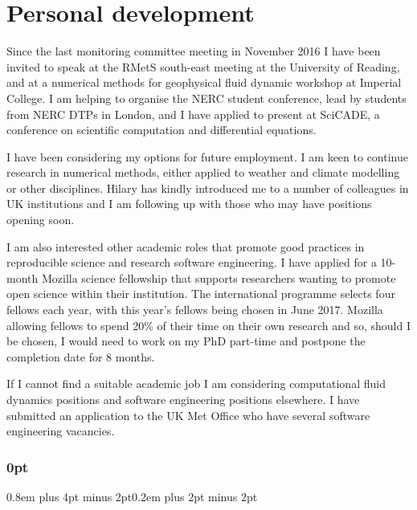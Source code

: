 \documentclass[a4paper,11pt]{article}
\begin{document}

\section{Personal development}

Since the last monitoring committee meeting in November 2016 I have been invited to speak at the RMetS south-east meeting at the University of Reading, and at a numerical methods for geophysical fluid dynamic workshop at Imperial College.  I am helping to organise the NERC student conference, lead by students from NERC DTPs in London, and I have applied to present at SciCADE, a conference on scientific computation and differential equations.

I have been considering my options for future employment.  I am keen to continue research in numerical methods, either applied to weather and climate modelling or other disciplines.
Hilary has kindly introduced me to a number of colleagues in UK institutions and I am following up with those who may have positions opening soon.

I am also interested other academic roles that promote good practices in reproducible science and research software engineering.
I have applied for a 10-month Mozilla science fellowship that supports researchers wanting to promote open science within their institution.
The international programme selects four fellows each year, with this year's fellows being chosen in June 2017.
Mozilla allowing fellows to spend 20\% of their time on their own research and so, should I be chosen, I would need to work on my PhD part-time and postpone the completion date for 8 months.

If I cannot find a suitable academic job I am considering computational fluid dynamics positions and software engineering positions elsewhere.
I have submitted an application to the UK Met Office who have several software engineering vacancies.


                                                 


\newpage

\titlespacing\subsubsection{0pt}{0.8em plus 4pt minus 2pt}{0.2em plus 2pt minus 2pt}
\end{document}
